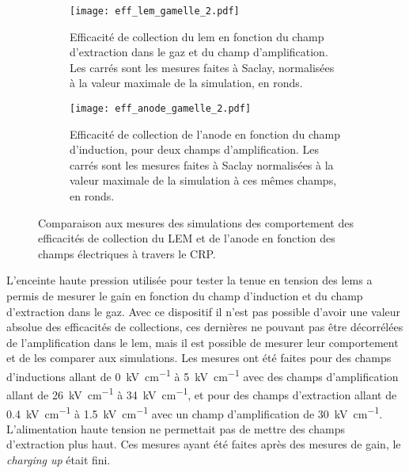       \begin{figure}[!htb]
        \begin{subfigure}{0.48\textwidth}
          \centering
          \texttt{[image: eff\_lem\_gamelle\_2.pdf]}
          \caption{\label{fig::eff_lem_gamelle}Efficacité de collection du \gls{lem} en fonction du champ d'extraction dans le gaz et du champ d'amplification. Les carrés sont les mesures faites à Saclay, normalisées à la valeur maximale de la simulation, en ronds.}
        \end{subfigure}\hfill
        \begin{subfigure}{0.48\textwidth}
          \centering
          \texttt{[image: eff\_anode\_gamelle\_2.pdf]}
          \caption{\label{fig::eff_anode_gamelle}Efficacité de collection de l'anode en fonction du champ d'induction, pour deux champs d'amplification. Les carrés sont les mesures faites à Saclay normalisées à la valeur maximale de la simulation à ces mêmes champs, en ronds.}
        \end{subfigure}
        \caption[Comparaison aux mesures des simulations des efficacités de collection du LEM et de l'anode en fonction des champs électriques à travers le CRP]{\label{fig::eff_gamelle}Comparaison aux mesures des simulations des comportement des efficacités de collection du LEM et de l'anode en fonction des champs électriques à travers le CRP.}
      \end{figure}
      
      L'enceinte haute pression utilisée pour tester la tenue en tension des \glspl{lem} a permis de mesurer le gain en fonction du champ d'induction et du champ d'extraction dans le gaz. Avec ce dispositif il n'est pas possible d'avoir une valeur absolue des efficacités de collections, ces dernières ne pouvant pas être décorrélées de l'amplification dans le \gls{lem}, mais il est possible de mesurer leur comportement et de les comparer aux simulations. Les mesures ont été faites pour des champs d'inductions allant de \SI{0}{\kilo\volt\per\centi\meter} à \SI{5}{\kilo\volt\per\centi\meter} avec des champs d'amplification allant de \SI{26}{\kilo\volt\per\centi\meter} à \SI{34}{\kilo\volt\per\centi\meter}, et pour des champs d'extraction allant de \SI{0.4}{\kilo\volt\per\centi\meter} à \SI{1.5}{\kilo\volt\per\centi\meter} avec un champ d'amplification de \SI{30}{\kilo\volt\per\centi\meter}. L'alimentation haute tension ne permettait pas de mettre des champs d'extraction plus haut. Ces mesures ayant été faites après des mesures de gain, le \textit{charging up} était fini. 


